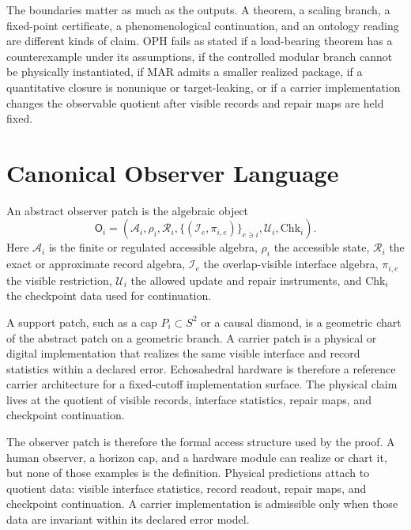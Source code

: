 \documentclass[11pt]{article}
\newcounter{none}
\begin{document}
The boundaries matter as much as the outputs. A theorem, a scaling branch, a fixed-point
certificate, a phenomenological continuation, and an ontology reading are different kinds of
claim. OPH fails as stated if a load-bearing theorem has a counterexample under its assumptions,
if the controlled modular branch cannot be physically instantiated, if MAR admits a smaller
realized package, if a quantitative closure is nonunique or target-leaking, or if a carrier
implementation changes the observable quotient after visible records and repair maps are held
fixed.

\section*{Canonical Observer Language}

An abstract observer patch is the algebraic object
\[
\mathsf O_i=
\left(
\mathcal A_i,\rho_i,\mathcal R_i,
\{(\mathcal I_e,\pi_{i,e})\}_{e\ni i},
\mathcal U_i,\mathrm{Chk}_i
\right).
\]
Here \(\mathcal A_i\) is the finite or regulated accessible algebra, \(\rho_i\) the accessible
state, \(\mathcal R_i\) the exact or approximate record algebra, \(\mathcal I_e\) the overlap-visible
interface algebra, \(\pi_{i,e}\) the visible restriction, \(\mathcal U_i\) the allowed update and
repair instruments, and \(\mathrm{Chk}_i\) the checkpoint data used for continuation.

A support patch, such as a cap \(P_i\subset S^2\) or a causal diamond, is a geometric chart of the
abstract patch on a geometric branch. A carrier patch is a physical or digital implementation that
realizes the same visible interface and record statistics within a declared error. Echosahedral
hardware is therefore a reference carrier architecture for a fixed-cutoff implementation surface.
The physical claim lives at the quotient of visible records, interface statistics, repair maps, and
checkpoint continuation.

The observer patch is therefore the formal access structure used by the proof. A human observer, a
horizon cap, and a hardware module can realize or chart it, but none of those examples is the
definition. Physical predictions attach to quotient data: visible interface statistics, record
readout, repair maps, and checkpoint continuation. A carrier implementation is admissible only when
those data are invariant within its declared error model.
\end{document}
